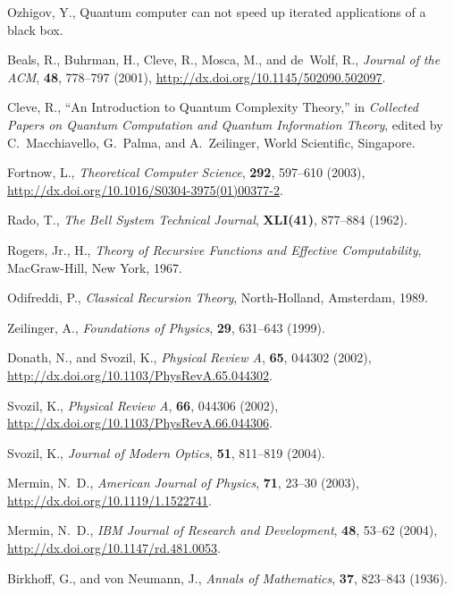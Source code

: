 \begin{thebibliography}{10}
Ozhigov, Y., Quantum computer can not speed up iterated applications of a black
  box.

Beals, R., Buhrman, H., Cleve, R., Mosca, M., and de~Wolf, R., \emph{Journal of
  the ACM}, \textbf{48}, 778--797 (2001),
  \urlprefix\url{http://dx.doi.org/10.1145/502090.502097}.

Cleve, R., \enquote{An Introduction to Quantum Complexity Theory,} in
  \emph{Collected Papers on Quantum Computation and Quantum Information
  Theory}, edited by C.~Macchiavello, G.~Palma, and A.~Zeilinger, World
  Scientific, Singapore.

Fortnow, L., \emph{Theoretical Computer Science}, \textbf{292}, 597--610
  (2003), \urlprefix\url{http://dx.doi.org/10.1016/S0304-3975(01)00377-2}.

Rado, T., \emph{The Bell System Technical Journal}, \textbf{XLI(41)}, 877--884
  (1962).

{Rogers, Jr.}, H., \emph{Theory of Recursive Functions and Effective
  Computability}, MacGraw-Hill, New York, 1967.

Odifreddi, P., \emph{Classical Recursion Theory}, North-Holland, Amsterdam,
  1989.

Zeilinger, A., \emph{Foundations of Physics}, \textbf{29}, 631--643 (1999).

Donath, N., and Svozil, K., \emph{Physical Review A}, \textbf{65}, 044302
  (2002), \urlprefix\url{http://dx.doi.org/10.1103/PhysRevA.65.044302}.

Svozil, K., \emph{Physical Review A}, \textbf{66}, 044306 (2002),
  \urlprefix\url{http://dx.doi.org/10.1103/PhysRevA.66.044306}.

Svozil, K., \emph{Journal of Modern Optics}, \textbf{51}, 811--819 (2004).

Mermin, N.~D., \emph{American Journal of Physics}, \textbf{71}, 23--30 (2003),
  \urlprefix\url{http://dx.doi.org/10.1119/1.1522741}.

Mermin, N.~D., \emph{IBM Journal of Research and Development}, \textbf{48},
  53--62 (2004), \urlprefix\url{http://dx.doi.org/10.1147/rd.481.0053}.

Birkhoff, G., and von Neumann, J., \emph{Annals of Mathematics}, \textbf{37},
  823--843 (1936).


\end{thebibliography}
